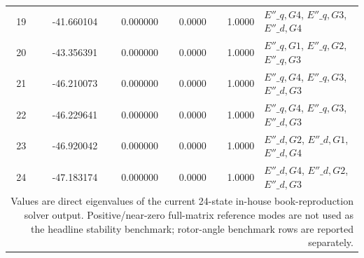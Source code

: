 \begin{tabular}{r r r r r p{5.0cm}}
19 & -41.660104 & 0.000000 & 0.0000 & 1.0000 & $E''\_{q,G4}$, $E''\_{q,G3}$, $E''\_{d,G4}$\\
20 & -43.356391 & 0.000000 & 0.0000 & 1.0000 & $E''\_{q,G1}$, $E''\_{q,G2}$, $E''\_{q,G3}$\\
21 & -46.210073 & 0.000000 & 0.0000 & 1.0000 & $E''\_{q,G4}$, $E''\_{q,G3}$, $E''\_{d,G3}$\\
22 & -46.229641 & 0.000000 & 0.0000 & 1.0000 & $E''\_{q,G4}$, $E''\_{q,G3}$, $E''\_{d,G3}$\\
23 & -46.920042 & 0.000000 & 0.0000 & 1.0000 & $E''\_{d,G2}$, $E''\_{d,G1}$, $E''\_{d,G4}$\\
24 & -47.183174 & 0.000000 & 0.0000 & 1.0000 & $E''\_{d,G4}$, $E''\_{d,G2}$, $E''\_{d,G3}$\\
\bottomrule\multicolumn{6}{p{0.92\textwidth}}{\scriptsize Values are direct eigenvalues of the current 24-state in-house book-reproduction solver output. Positive/near-zero full-matrix reference modes are not used as the headline stability benchmark; rotor-angle benchmark rows are reported separately.}\\
\end{tabular}\endgroup
